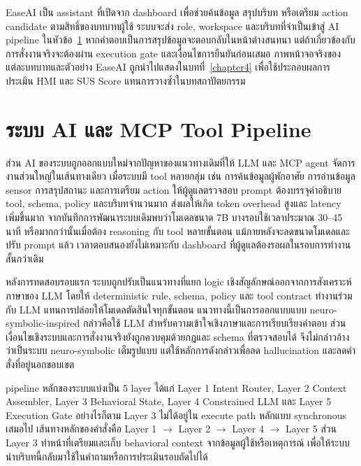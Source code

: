 EaseAI เป็น assistant ที่เปิดจาก dashboard เพื่อช่วยค้นข้อมูล สรุปบริบท หรือเตรียม action candidate ตามสิทธิ์ของบทบาทผู้ใช้ ระบบจะส่ง role, workspace และบริบทที่จำเป็นเข้าสู่ AI pipeline ในหัวข้อ~\ref{sec:ch3_ai} หากคำตอบเป็นการสรุปข้อมูลจะตอบกลับในหน้าต่างสนทนา แต่ถ้าเกี่ยวข้องกับการสั่งงานจริงจะต้องผ่าน execution gate และเงื่อนไขการยืนยันก่อนเสมอ ภาพหน้าจอจริงของแต่ละบทบาทและตัวอย่าง EaseAI ถูกนำไปแสดงในบทที่~\ref{chapter4} เพื่อใช้ประกอบผลการประเมิน HMI และ SUS Score แทนการวางซ้ำในบทสถาปัตยกรรม

\section{ระบบ AI และ MCP Tool Pipeline}
\label{sec:ch3_ai}
ส่วน AI ของระบบถูกออกแบบใหม่จากปัญหาของแนวทางเดิมที่ให้ LLM และ MCP agent จัดการงานส่วนใหญ่ในเส้นทางเดียว เมื่อระบบมี tool หลายกลุ่ม เช่น การค้นข้อมูลผู้พักอาศัย การอ่านข้อมูล sensor การสรุปสถานะ และการเตรียม action ให้ผู้ดูแลตรวจสอบ prompt ต้องบรรจุคำอธิบาย tool, schema, policy และบริบทจำนวนมาก ส่งผลให้เกิด token overhead สูงและ latency เพิ่มขึ้นมาก จากบันทึกการพัฒนาระบบเดิมพบว่าโมเดลขนาด 7B บางรอบใช้เวลาประมาณ 30--45 นาที หรือมากกว่านั้นเมื่อต้อง reasoning กับ tool หลายขั้นตอน แม้ภายหลังจะลดขนาดโมเดลและปรับ prompt แล้ว เวลาตอบสนองยังไม่เหมาะกับ dashboard ที่ผู้ดูแลต้องรอผลในรอบการทำงานสั้นกว่าเดิม

หลังการทดสอบรอบแรก ระบบถูกปรับเป็นแนวทางที่แยก logic เชิงสัญลักษณ์ออกจากการสังเคราะห์ภาษาของ LLM โดยให้ deterministic rule, schema, policy และ tool contract ทำงานร่วมกับ LLM แทนการปล่อยให้โมเดลตัดสินใจทุกขั้นตอน แนวทางนี้เป็นการออกแบบแบบ neuro-symbolic-inspired กล่าวคือใช้ LLM สำหรับความเข้าใจเชิงภาษาและการเรียบเรียงคำตอบ ส่วนเงื่อนไขเชิงระบบและการสั่งงานจริงยังถูกควบคุมด้วยกฎและ schema ที่ตรวจสอบได้ จึงไม่กล่าวอ้างว่าเป็นระบบ neuro-symbolic เต็มรูปแบบ แต่ใช้หลักการดังกล่าวเพื่อลด hallucination และลดคำสั่งที่อยู่นอกขอบเขต

pipeline หลักของระบบแบ่งเป็น 5 layer ได้แก่ Layer 1 Intent Router, Layer 2 Context Assembler, Layer 3 Behavioral State, Layer 4 Constrained LLM และ Layer 5 Execution Gate อย่างไรก็ตาม Layer 3 ไม่ได้อยู่ใน execute path หลักแบบ synchronous เสมอไป เส้นทางหลักของคำสั่งคือ Layer 1 \(\rightarrow\) Layer 2 \(\rightarrow\) Layer 4 \(\rightarrow\) Layer 5 ส่วน Layer 3 ทำหน้าที่เตรียมและเก็บ behavioral context จากข้อมูลผู้ใช้หรือเหตุการณ์ เพื่อให้ระบบนำบริบทนี้กลับมาใช้ในคำถามหรือการประเมินรอบถัดไปได้

